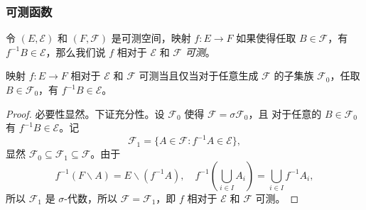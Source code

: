 \documentclass[fontset=none]{Notes}
\begin{document}
\subsubsection{可测函数}

令 $(E,\mathcal{E})$ 和 $(F,\mathcal{F})$ 是可测空间，映射 $f:E\to F$ 如果使得任取 $B\in \mathcal{F}$，有
$f^{-1}B\in \mathcal{E}$，那么我们说 $f$ 相对于 $\mathcal{E}$ 和 $\mathcal{F}$ \emph{可测}。

\begin{proposition}
  映射 $f:E\to F$ 相对于 $\mathcal{E}$ 和 $\mathcal{F}$ 可测当且仅当对于任意生成 $\mathcal{F}$ 的子集族
  $\mathcal{F}_0$，任取 $B\in \mathcal{F}_0$，有 $f^{-1}B\in \mathcal{E}$。
\end{proposition}
\begin{proof}
  必要性显然。下证充分性。设 $\mathcal{F}_0$ 使得 $\mathcal{F}=\sigma \mathcal{F}_0$，且
  对于任意的 $B\in \mathcal{F}_0$ 有 $f^{-1}B\in \mathcal{E}$。记
  \[
    \mathcal{F}_1=\{A\in \mathcal{F}: f^{-1}A\in \mathcal{E}\},
  \]
  显然 $\mathcal{F}_0\subseteq \mathcal{F}_1\subseteq \mathcal{F}$。由于
  \[
    f^{-1}\left(F \smallsetminus A\right)=E \smallsetminus(f^{-1}A),\quad
    f^{-1}\left(\bigcup_{i\in I}A_i\right)=\bigcup_{i\in I} f^{-1}A_i,
  \]
  所以 $\mathcal{F}_1$ 是 $\sigma$-代数，所以 $\mathcal{F}=\mathcal{F}_1$，即 $f$ 
  相对于 $\mathcal{E}$ 和 $\mathcal{F}$ 可测。
\end{proof}
\end{document}
